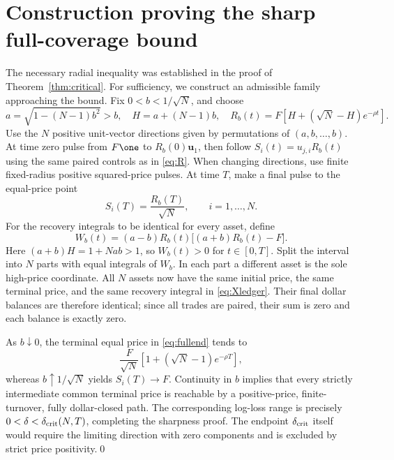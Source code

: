 \documentclass[review,hidelinks,onefignum,onetabnum]{siamonline250211}
\begin{document}
\section{Construction proving the sharp full-coverage bound}\label{app:sharp}
The necessary radial inequality was established in the proof of Theorem~\ref{thm:critical}. For sufficiency, we construct an admissible family approaching the bound. Fix $0<b<1/\sqrt N$, and choose
\begin{equation}\label{eq:fullab}
a=\sqrt{1-(N-1)b^2}>b,
\quad H=a+(N-1)b,
\quad R_b(t)=F\left[H+(\sqrt N-H)e^{-\rho t}\right].
\end{equation}
Use the $N$ positive unit-vector directions given by permutations of $(a,b,\ldots,b)$. At time zero pulse from $F\one$ to $R_b(0)\bm u_1$, then follow $S_i(t)=u_{j,i}R_b(t)$ using the same paired controls as in \eqref{eq:R}. When changing directions, use finite fixed-radius positive squared-price pulses. At time $T$, make a final pulse to the equal-price point
\begin{equation}\label{eq:fullend}
S_i(T)=\frac{R_b(T)}{\sqrt N},\qquad i=1,\ldots,N.
\end{equation}
For the recovery integrals to be identical for every asset, define
\begin{equation}\label{eq:fullW}
W_b(t)=(a-b)R_b(t)\big[(a+b)R_b(t)-F\big].
\end{equation}
Here $(a+b)H=1+Nab>1$, so $W_b(t)>0$ for $t\in[0,T]$. Split the interval into $N$ parts with equal integrals of $W_b$. In each part a different asset is the sole high-price coordinate. All $N$ assets now have the same initial price, the same terminal price, and the same recovery integral in \eqref{eq:Xledger}. Their final dollar balances are therefore identical; since all trades are paired, their sum is zero and each balance is exactly zero.

As $b\downarrow0$, the terminal equal price in \eqref{eq:fullend} tends to
\[
\frac{F}{\sqrt N}\left[1+(\sqrt N-1)e^{-\rho T}\right],
\]
whereas $b\uparrow1/\sqrt N$ yields $S_i(T)\to F$. Continuity in $b$ implies that every strictly intermediate common terminal price is reachable by a positive-price, finite-turnover, fully dollar-closed path. The corresponding log-loss range is precisely $0<\delta<\delta_{\rm crit}(N,T)$, completing the sharpness proof. The endpoint $\delta_{\rm crit}$ itself would require the limiting direction with zero components and is excluded by strict price positivity.\qed
\end{document}
